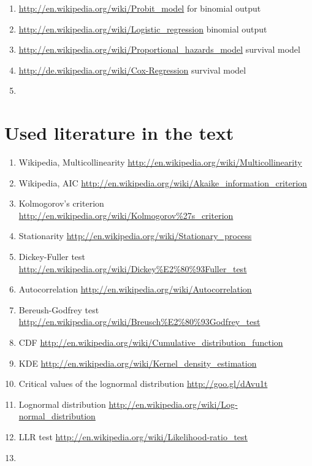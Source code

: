 \documentclass{article}
\begin{document}
\begin{enumerate}
		\begin{enumerate}
			\item \textcolor{black}{\url{http://en.wikipedia.org/wiki/Probit_model}} for binomial output
			\item \textcolor{black}{\url{http://en.wikipedia.org/wiki/Logistic_regression}}	binomial output
			\item \textcolor{black}{\url{http://en.wikipedia.org/wiki/Proportional_hazards_model}} survival model 
			\item \textcolor{black}{\url{http://de.wikipedia.org/wiki/Cox-Regression}} survival model
			\item \textcolor{black}{\url{}}
		\end{enumerate}
\end{enumerate}
\section*{Used literature in the text}
\begin{enumerate}
	\item Wikipedia, Multicollinearity \url{http://en.wikipedia.org/wiki/Multicollinearity}
	\item Wikipedia, AIC \url{http://en.wikipedia.org/wiki/Akaike_information_criterion}
	\item Kolmogorov's criterion \url{http://en.wikipedia.org/wiki/Kolmogorov\%27s_criterion}
	\item Stationarity \url{http://en.wikipedia.org/wiki/Stationary_process}
	\item Dickey-Fuller test \url{http://en.wikipedia.org/wiki/Dickey\%E2\%80\%93Fuller_test}
	\item Autocorrelation \url{http://en.wikipedia.org/wiki/Autocorrelation}
	\item Bereush-Godfrey test \url{http://en.wikipedia.org/wiki/Breusch\%E2\%80\%93Godfrey_test}
	\item CDF \url{http://en.wikipedia.org/wiki/Cumulative_distribution_function}
	\item KDE \url{http://en.wikipedia.org/wiki/Kernel_density_estimation}
	\item Critical values of the lognormal distribution \url{http://goo.gl/dAvu1t}
	\item Lognormal distribution \url{http://en.wikipedia.org/wiki/Log-normal_distribution}
	\item LLR test  \url{http://en.wikipedia.org/wiki/Likelihood-ratio_test}
	\item  \url{}
\end{enumerate}
\end{document}
